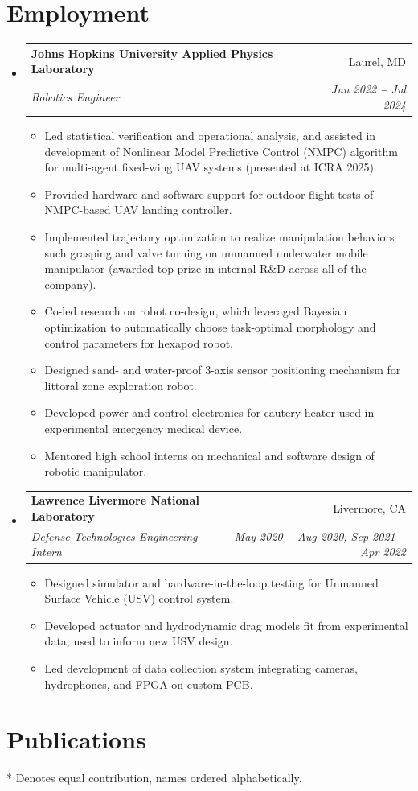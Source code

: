 \documentclass[letterpaper,11pt]{article}
\makeatletter
\newcommand{\resumeItem}[1]{
  \item\small{
    {#1 \vspace{-2pt}}
  }
}
\newcommand{\resumeSubheading}[4]{
  \vspace{-2pt}\item
    \begin{tabular*}{0.97\textwidth}[t]{l@{\extracolsep{\fill}}r}
      \textbf{#1} & #2 \\
      \textit{\small#3} & \textit{\small #4} \\
    \end{tabular*}\vspace{-7pt}
}
\newcommand{\resumeSubHeadingListStart}{\begin{itemize}[leftmargin=0.15in, label={}]}
\newcommand{\resumeSubHeadingListEnd}{\end{itemize}}
\newcommand{\resumeItemListStart}{\begin{itemize}}
\newcommand{\resumeItemListEnd}{\end{itemize}\vspace{-5pt}}
\makeatother
\begin{document}
\section{Employment}
  \vspace{3pt}
  \resumeSubHeadingListStart
    \resumeSubheading
      {Johns Hopkins University Applied Physics Laboratory}{Laurel, MD}
      {Robotics Engineer}{Jun 2022 \textbf{--} Jul 2024}
        \resumeItemListStart
      \resumeItem{Led statistical verification and operational analysis, and assisted in development of Nonlinear Model Predictive Control (NMPC) algorithm for
      multi-agent fixed-wing UAV systems \cite{madabushi2025Swarming} (presented at ICRA 2025).}
      \resumeItem{Provided hardware and software support for outdoor flight tests of NMPC-based UAV landing controller.}
      \resumeItem{Implemented trajectory optimization to realize manipulation behaviors such grasping and valve turning on
      unmanned underwater mobile manipulator (awarded top prize in internal R\&D across all of the company).}
      \resumeItem{Co-led research on robot co-design, which leveraged Bayesian optimization to automatically choose 
      task-optimal morphology and control parameters for hexapod robot.}
      \resumeItem{Designed sand- and water-proof 3-axis sensor positioning mechanism for littoral zone exploration robot.}
      \resumeItem{Developed power and control electronics for cautery heater used in experimental emergency medical device.}
      \resumeItem{Mentored high school interns on mechanical and software design of robotic manipulator.}
    \resumeItemListEnd
    \resumeSubheading
      {Lawrence Livermore National Laboratory}{Livermore, CA}
      {Defense Technologies Engineering Intern}{May 2020 \textbf{--} Aug 2020,
      Sep 2021 \textbf{--} Apr 2022}
      \resumeItemListStart
        \resumeItem{Designed simulator and hardware-in-the-loop testing
        for Unmanned Surface Vehicle (USV) control system.}
        \resumeItem{Developed actuator and hydrodynamic drag models fit from experimental
        data, used to inform new USV design.}
        \resumeItem{Led development of data collection system integrating cameras,
        hydrophones, and FPGA on custom PCB.}
      \resumeItemListEnd
    
  \resumeSubHeadingListEnd

\section{Publications}
  \vspace{3pt}
  \nocite{*}
  \printbibliography[heading=none]
  \par\smallskip
  {\footnotesize {*} Denotes equal contribution, names ordered alphabetically.\par}
\end{document}
